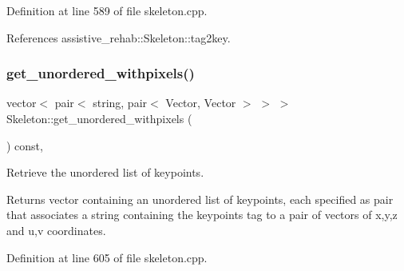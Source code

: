 Definition at line 589 of file skeleton.\+cpp.


\begin{DoxyCode}{0}

\end{DoxyCode}


References assistive\+\_\+rehab\+::\+Skeleton\+::tag2key.

\mbox{\label{classassistive__rehab_1_1Skeleton_a513a3dc56d55a7b10b256378ae63c6c7}} 
\subsubsection{\texorpdfstring{get\_unordered\_withpixels()}{get\_unordered\_withpixels()}}
{\footnotesize\ttfamily vector$<$ pair$<$ string, pair$<$ Vector, Vector $>$ $>$ $>$ Skeleton\+::get\+\_\+unordered\+\_\+withpixels (\begin{DoxyParamCaption}{ }\end{DoxyParamCaption}) const\hspace{0.3cm}{\ttfamily [virtual]}, {\ttfamily [inherited]}}



Retrieve the unordered list of keypoints. 

\begin{DoxyReturn}{Returns}
vector containing an unordered list of keypoints, each specified as pair that associates a string containing the keypoint\textquotesingle{}s tag to a pair of vectors of x,y,z and u,v coordinates. 
\end{DoxyReturn}


Definition at line 605 of file skeleton.\+cpp.


\begin{DoxyCode}{0}

\end{DoxyCode}


